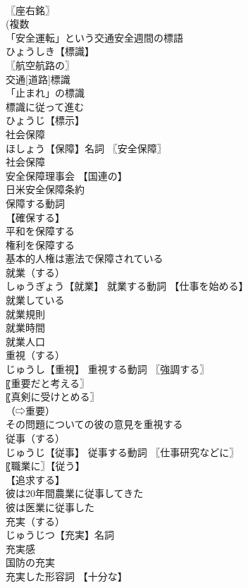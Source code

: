 \documentclass[8pt]{extreport}
\begin{document}
\begin{CJK}{UTF8}{min}
\\	〖座右銘〗
\\	(複数 
\\	「安全運転」という交通安全週間の標語 
\\	ひょうしき【標識】 
\\	〖航空航路の〗
\\	交通[道路]標識 
\\	「止まれ」の標識 
\\	標識に従って進む 
\\	ひょうじ【標示】 
\\	社会保障		
\\	ほしょう【保障】名詞 〖安全保障〗
\\	社会保障 
\\	安全保障理事会 【国連の】
\\	日米安全保障条約 
\\	保障する動詞 
\\	【確保する】
\\	平和を保障する 
\\	権利を保障する 
\\	基本的人権は憲法で保障されている 
\\	就業（する）		
\\	しゅうぎょう【就業】 就業する動詞 【仕事を始める】
\\	就業している 
\\	就業規則 
\\	就業時間 
\\	就業人口 
\\	重視（する）		
\\	じゅうし【重視】 重視する動詞 〖強調する〗
\\	〖重要だと考える〗
\\	〖真剣に受けとめる〗
\\	（⇨重要） 
\\	その問題についての彼の意見を重視する 
\\	従事（する）		
\\	じゅうじ【従事】 従事する動詞 〖仕事研究などに〗
\\	〖職業に〗【従う】
\\	【追求する】
\\	彼は20年間農業に従事してきた 
\\	彼は医業に従事した 
\\	充実（する）		
\\	じゅうじつ【充実】名詞 
\\	充実感 
\\	国防の充実 
\\	充実した形容詞 【十分な】

\end{CJK}
\end{document}
